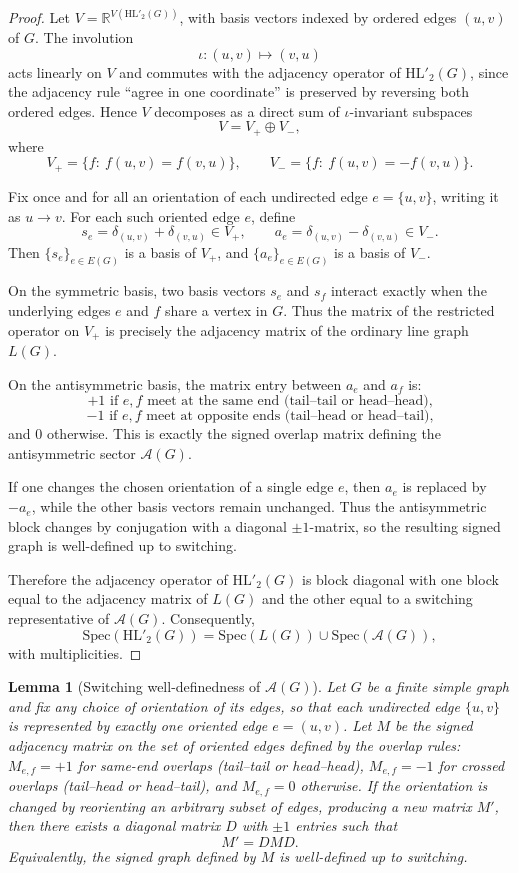 \documentclass[11pt]{article}
\newtheorem{lemma}{Lemma}
\newcommand{\Spec}{\mathrm{Spec}}
\newcommand{\HL}{\mathrm{HL}}
\theoremstyle{plain}
\begin{document}
\begin{proof}
Let \(V=\mathbb R^{V(\HL'_2(G))}\), with basis vectors indexed by ordered edges \((u,v)\) of \(G\).
The involution
\[
\iota:(u,v)\longmapsto (v,u)
\]
acts linearly on \(V\) and commutes with the adjacency operator of \(\HL'_2(G)\), since the adjacency rule
“agree in one coordinate” is preserved by reversing both ordered edges. Hence \(V\) decomposes as a direct sum
of \(\iota\)-invariant subspaces
\[
V=V_+\oplus V_-,
\]
where
\[
V_+=\{f:\ f(u,v)=f(v,u)\},
\qquad
V_-=\{f:\ f(u,v)=-f(v,u)\}.
\]

Fix once and for all an orientation of each undirected edge \(e=\{u,v\}\), writing it as \(u\to v\). For
each such oriented edge \(e\), define
\[
s_e=\delta_{(u,v)}+\delta_{(v,u)}\in V_+,
\qquad
a_e=\delta_{(u,v)}-\delta_{(v,u)}\in V_-.
\]
Then \(\{s_e\}_{e\in E(G)}\) is a basis of \(V_+\), and \(\{a_e\}_{e\in E(G)}\) is a basis of \(V_-\).

On the symmetric basis, two basis vectors \(s_e\) and \(s_f\) interact exactly when the underlying edges
\(e\) and \(f\) share a vertex in \(G\). Thus the matrix of the restricted operator on \(V_+\) is precisely
the adjacency matrix of the ordinary line graph \(L(G)\).

On the antisymmetric basis, the matrix entry between \(a_e\) and \(a_f\) is:
\[
+1 \text{ if } e,f \text{ meet at the same end (tail--tail or head--head),}
\]
\[
-1 \text{ if } e,f \text{ meet at opposite ends (tail--head or head--tail),}
\]
and \(0\) otherwise. This is exactly the signed overlap matrix defining the antisymmetric sector
\(\mathcal A(G)\).

If one changes the chosen orientation of a single edge \(e\), then \(a_e\) is replaced by \(-a_e\), while the
other basis vectors remain unchanged. Thus the antisymmetric block changes by conjugation with a diagonal
\(\pm1\)-matrix, so the resulting signed graph is well-defined up to switching.

Therefore the adjacency operator of \(\HL'_2(G)\) is block diagonal with one block equal to the adjacency
matrix of \(L(G)\) and the other equal to a switching representative of \(\mathcal A(G)\). Consequently,
\[
\Spec(\HL'_2(G))
=
\Spec(L(G))
\cup
\Spec(\mathcal A(G)),
\]
with multiplicities.
\end{proof}
\begin{lemma}[Switching well-definedness of $\mathcal A(G)$]\label{lem:switching-welldefined}
Let $G$ be a finite simple graph and fix any choice of orientation of its edges, so that each
undirected edge $\{u,v\}$ is represented by exactly one oriented edge $e=(u,v)$.
Let $M$ be the signed adjacency matrix on the set of oriented edges defined by the overlap rules:
$M_{e,f}=+1$ for same-end overlaps (tail--tail or head--head), $M_{e,f}=-1$ for crossed overlaps
(tail--head or head--tail), and $M_{e,f}=0$ otherwise.
If the orientation is changed by reorienting an arbitrary subset of edges, producing a new matrix
$M'$, then there exists a diagonal matrix $D$ with $\pm1$ entries such that
\[
M' = D M D.
\]
Equivalently, the signed graph defined by $M$ is well-defined up to switching.
\end{lemma}
\end{document}
